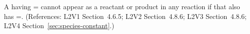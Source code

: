 A \Species having = cannot
appear as a reactant or product in any reaction if that \Species
also has =.  (References: L2V1
Section~4.6.5; L2V2 Section~4.8.6; L2V3 Section~4.8.6; L2V4 Section~\ref{sec:species-constant}.)

